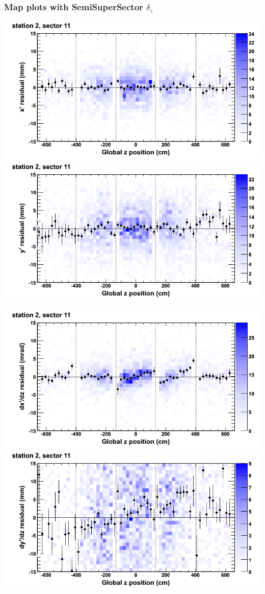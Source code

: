 \documentclass[compress]{beamer}
\begin{document}
\begin{frame}
\frametitle{Map plots with SemiSuperSector $\delta_z$}
\includegraphics[width=0.5\linewidth]{zfit_mapplots/DTvsz_st2sec11_x.png}
\includegraphics[width=0.5\linewidth]{zfit_mapplots/DTvsz_st2sec11_y.png}

\includegraphics[width=0.5\linewidth]{zfit_mapplots/DTvsz_st2sec11_dxdz.png}
\includegraphics[width=0.5\linewidth]{zfit_mapplots/DTvsz_st2sec11_dydz.png}
\end{frame}
\end{document}
